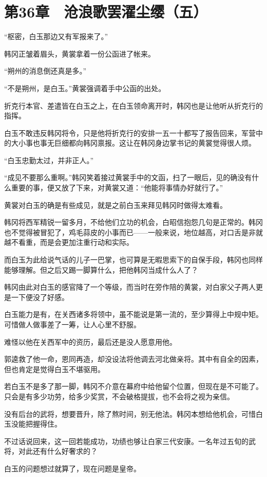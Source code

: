 \section{第36章　沧浪歌罢濯尘缨（五）}

“枢密，白玉那边又有军报来了。”

韩冈正皱着眉头，黄裳拿着一份公函进了帐来。

“朔州的消息倒还真是多。”

“不是朔州，是白玉。”黄裳强调着手中公函的出处。

折克行本官、差遣皆在白玉之上，在白玉领命离开时，韩冈也是让他听从折克行的指挥。

白玉不敢违反韩冈将令，只是他将折克行的安排一五一十都写了报告回来，军营中的大小事也事无巨细都向韩冈禀报。这让在韩冈身边掌书记的黄裳觉得很人烦。

“白玉忠勤太过，并非正人。”

“成见不要那么重啊。”韩冈笑着接过黄裳手中的文函，扫了一眼后，见的确没有什么重要的事，便又放了下来，对黄裳又道：“他能将事情办好就行了。”

黄裳对白玉的确是有些成见，就是之前白玉来拜见韩冈时做得太难看。

韩冈将西军精锐一留多月，不给他们立功的机会，白昭信抱怨几句是正常的。韩冈也不觉得被冒犯了，鸡毛蒜皮的小事而已——一般来说，地位越高，对口舌是非就越不看重，而是会更加注重行动和实际。

而白玉为此给说气话的儿子一巴掌，也可算是无暇思索下的自保手段，韩冈也同样能够理解。但之后又踢一脚算什么，把他韩冈当成什么人了？

韩冈由此对白玉的感官降了一个等级，而当时在旁作陪的黄裳，对白家父子两人更是一下便没了好感。

白玉能力是有，在关西诸多将领中，虽不能说是第一流的，至少算得上中规中矩。可惜做人做事差了一筹，让人心里不舒服。

难怪以他在关西军中的资历，最后还是没人愿意用他。

郭逵救了他一命，恩同再造，却没设法将他调去河北做亲将。其中有自全的因素，但也肯定是觉得白玉不堪驱用。

若白玉不是多了那一脚，韩冈不介意在幕府中给他留个位置，但现在是不可能了。只会是有多少功劳，给多少奖赏，不会破格提拔，也不会将之视为亲信。

没有后台的武将，想要晋升，除了熬时间，别无他法。韩冈本想给他机会，可惜白玉没能把握得住。

不过话说回来，这一回若能成功，功绩也够让白家三代安康。一名年过五旬的武将，对此还有什么好奢求的？

白玉的问题想过就算了，现在问题是皇帝。

